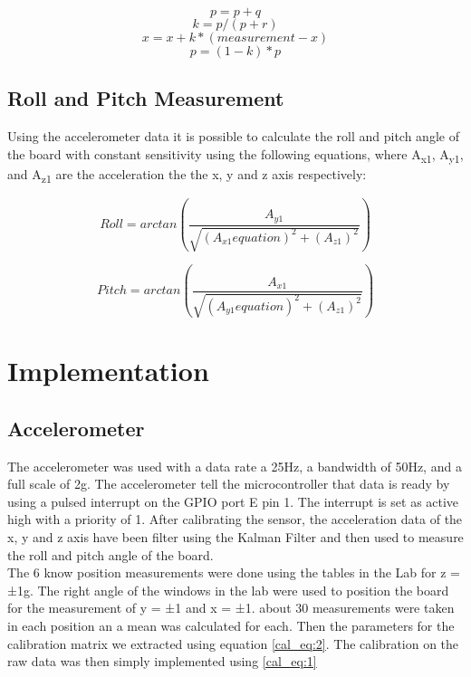 \documentclass[12pt]{article}
\begin{document}
\begin{equation}
p=p+q
\end{equation}
\begin{equation}
k=p/(p+r)
\end{equation}
\begin{equation}
x=x+k*(measurement-x)
\end{equation}
\begin{equation}
p=(1-k)*p
\end{equation}

\subsection{Roll and Pitch Measurement}
Using the accelerometer data it is possible to calculate the roll and pitch angle of the board with constant sensitivity using the following equations, where A\textsubscript{x1}, A\textsubscript{y1}, and A\textsubscript{z1} are the acceleration the the x, y and z axis respectively:

\begin{equation}
Roll=arctan(\frac{A_{y1}}{\sqrt{(A_{x1}equation)^2+(A_{z1})^2}})
\end{equation}

\begin{equation}
Pitch=arctan(\frac{A_{x1}}{\sqrt{(A_{y1}equation)^2+(A_{z1})^2}})
\end{equation}

\section{Implementation}
\subsection{Accelerometer}
The accelerometer was used with a data rate a 25Hz, a bandwidth of 50Hz, and a full scale of 2g. The accelerometer tell the microcontroller that data is ready by using a pulsed interrupt on the GPIO port E pin 1. The interrupt is set as active high with a priority of 1. After calibrating the sensor, the acceleration data of the x, y and z axis have been filter using the Kalman Filter and then used to measure the roll and pitch angle of the board. \\

The 6 know position measurements were done using the tables in the Lab for z = ±1g. The right angle of the windows in the lab were used to position the board for the measurement of y = ±1 and x = ±1. about 30 measurements were taken in each position an a mean was calculated for each. Then the parameters for the calibration matrix we extracted using equation \ref{cal_eq:2}. The calibration on the raw data was then simply implemented using \ref{cal_eq:1}
\end{document}
